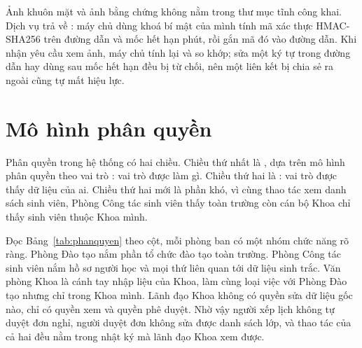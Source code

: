 Ảnh khuôn mặt và ảnh bằng chứng không nằm trong thư mục tĩnh công khai. Dịch
vụ trả về : máy chủ dùng khoá bí mật của
mình tính mã xác thực HMAC-SHA256 \cite{RFC2104} trên đường dẫn và mốc hết hạn
\FphutHetHanUrl{} phút, rồi gắn mã đó vào đường dẫn. Khi nhận yêu cầu xem ảnh,
máy chủ tính lại và so khớp; sửa một ký tự trong đường dẫn hay dùng sau mốc
hết hạn đều bị từ chối, nên một liên kết bị chia sẻ ra ngoài cũng tự mất hiệu
lực.

\section{Mô hình phân quyền}
\label{sec:phanquyen}

Phân quyền trong hệ thống có hai chiều. Chiều thứ nhất là , dựa trên mô hình phân quyền theo vai trò \cite{Sandhu1996RBAC}: vai trò được làm gì. Chiều thứ hai là : vai
trò được thấy dữ liệu của ai. Chiều thứ hai mới là phần khó, vì cùng thao tác
xem danh sách sinh viên, Phòng Công tác sinh viên thấy toàn trường còn cán
bộ Khoa chỉ thấy sinh viên thuộc Khoa mình.

Đọc Bảng~\ref{tab:phanquyen} theo cột, mỗi phòng ban có một nhóm chức năng rõ ràng. Phòng Đào tạo nắm
phần tổ chức đào tạo toàn trường. Phòng Công tác sinh viên nắm hồ sơ người
học và mọi thứ liên quan tới dữ liệu sinh trắc. Văn phòng Khoa là cánh tay
nhập liệu của Khoa, làm cùng loại việc với Phòng Đào tạo nhưng chỉ trong Khoa
mình. Lãnh đạo Khoa không có quyền sửa dữ liệu gốc nào, chỉ có quyền xem và
quyền phê duyệt. Nhờ vậy người xếp lịch không tự duyệt đơn nghỉ, người duyệt
đơn không sửa được danh sách lớp, và thao tác của cả hai đều nằm trong nhật
ký mà lãnh đạo Khoa xem được.

